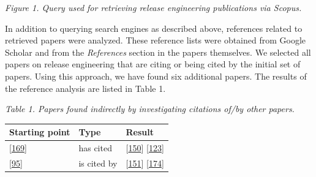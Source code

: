 \documentclass[]{book}
\begin{document}
\emph{Figure 1. Query used for retrieving release engineering
publications via Scopus.}

In addition to querying search engines as described above, references
related to retrieved papers were analyzed. These reference lists were
obtained from Google Scholar and from the \emph{References} section in
the papers themselves. We selected all papers on release engineering
that are citing or being cited by the initial set of papers. Using this
approach, we have found six additional papers. The results of the
reference analysis are listed in Table 1.

\emph{Table 1. Papers found indirectly by investigating citations of/by
other papers.}

\begin{longtable}[]{@{}lll@{}}
\toprule
\begin{minipage}[b]{0.23\columnwidth}\raggedright\strut
Starting point\strut
\end{minipage} & \begin{minipage}[b]{0.18\columnwidth}\raggedright\strut
Type\strut
\end{minipage} & \begin{minipage}[b]{0.25\columnwidth}\raggedright\strut
Result\strut
\end{minipage}\tabularnewline
\midrule
\endhead
\begin{minipage}[t]{0.23\columnwidth}\raggedright\strut
{[}\protect\hyperlink{ref-souza2015a}{169}{]}\strut
\end{minipage} & \begin{minipage}[t]{0.18\columnwidth}\raggedright\strut
has cited\strut
\end{minipage} & \begin{minipage}[t]{0.25\columnwidth}\raggedright\strut
{[}\protect\hyperlink{ref-plewnia2014a}{150}{]}
{[}\protect\hyperlink{ref-mantyla2015a}{123}{]}\strut
\end{minipage}\tabularnewline
\begin{minipage}[t]{0.23\columnwidth}\raggedright\strut
{[}\protect\hyperlink{ref-khomh2015a}{95}{]}\strut
\end{minipage} & \begin{minipage}[t]{0.18\columnwidth}\raggedright\strut
is cited by\strut
\end{minipage} & \begin{minipage}[t]{0.25\columnwidth}\raggedright\strut
{[}\protect\hyperlink{ref-poo-caamano2016a}{151}{]}
{[}\protect\hyperlink{ref-teixeira2017a}{174}{]}\strut
\end{minipage}\tabularnewline

\end{longtable}
\end{document}
